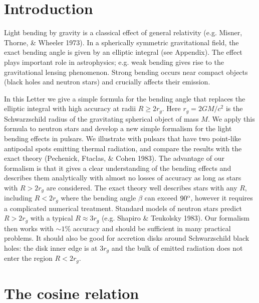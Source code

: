 \documentclass{article}
\def\dg{{\rm o}}
\begin{document}
\section{Introduction}


Light bending by gravity is a classical effect of general relativity (e.g. 
Misner, Thorne, \& Wheeler 1973). In a spherically symmetric gravitational 
field, the exact bending angle is given by an elliptic integral (see Appendix). 
The effect plays important role in astrophysics; e.g. weak bending gives rise 
to the gravitational lensing phenomenon. Strong bending occurs near compact 
objects (black holes and neutron stars) and crucially affects their emission.

In this Letter we give a simple formula for the bending angle that replaces the 
elliptic integral with high accuracy at radii $R\geq 2r_g$. Here $r_g=2GM/c^2$ 
is the Schwarzschild radius of the gravitating spherical object of mass $M$. 
We apply this formula to neutron stars and develop a new simple formalism for
the light bending effects in pulsars. We illustrate with pulsars that have two 
point-like antipodal spots emitting thermal radiation, and compare the results 
with the exact theory (Pechenick, Ftaclas, \& Cohen 1983). The advantage of our 
formalism is that it gives a clear understanding of the bending effects and 
describes them analytically with almost no losses of accuracy as long as stars 
with $R>2r_g$ are considered. The exact theory well describes stars with any 
$R$, including $R<2r_g$ where the bending angle $\beta$ can exceed $90^\dg$, 
however it requires a complicated numerical treatment. Standard models of 
neutron stars predict $R>2r_g$ with a typical $R\approx 3r_g$ (e.g. Shapiro 
\& Teukolsky 1983). Our formalism then works with $\sim 1\%$ accuracy and 
should be sufficient in many practical problems. It should also be good for 
accretion disks around Schwarzschild black holes: the disk inner edge is at 
$3r_g$ and the bulk of emitted radiation does not enter the region $R<2r_g$.



\section{The cosine relation}
\end{document}
